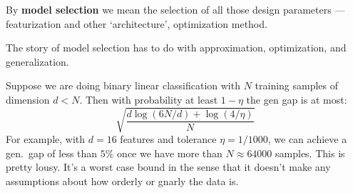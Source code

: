 

  By \textbf{model selection} we mean the selection of all those design
  parameters --- featurization and other `architecture', optimization method.

  The story of model selection has to do with approximation, optimization,
  and generalization.








\newpage




        Suppose we are doing binary linear classification with $N$ training
        samples of dimension $d< N$.  Then with probability at least $1-\eta$
        the gen gap is at most:
        $$
          \sqrt{\frac{d\log(6N/d) + \log(4/\eta)}{N}}
        $$
        For example, with $d=16$ features and tolerance $\eta=1/1000$, we
        can achieve a gen.\ gap of less than $5\%$ once we have more than
        $N\approx 64000$ samples.  This is pretty lousy.  It's a worst case
        bound in the sense that it doesn't make any assumptions about how
        orderly or gnarly the data is.

